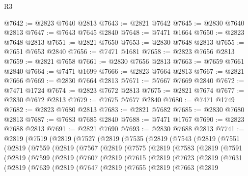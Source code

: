 \begin{lexlean}{R3}
\begin{coremodule}
@7642 := @2823 @7640 @2813
@7643 := @2821 @7642
@7645 := @2830 @7640 @2813
@7647 := @7643 @7645 @2840
@7648 := @7471 @1664
@7650 := @2823 @7648 @2813
@7651 := @2821 @7650
@7653 := @2830 @7648 @2813
@7655 := @7651 @7653 @2840
@7656 := @7471 @1681
@7658 := @2823 @7656 @2813
@7659 := @2821 @7658
@7661 := @2830 @7656 @2813
@7663 := @7659 @7661 @2840
@7664 := @7471 @1699
@7666 := @2823 @7664 @2813
@7667 := @2821 @7666
@7669 := @2830 @7664 @2813
@7671 := @7667 @7669 @2840
@7672 := @7471 @1724
@7674 := @2823 @7672 @2813
@7675 := @2821 @7674
@7677 := @2830 @7672 @2813
@7679 := @7675 @7677 @2840
@7680 := @7471 @1749
@7682 := @2823 @7680 @2813
@7683 := @2821 @7682
@7685 := @2830 @7680 @2813
@7687 := @7683 @7685 @2840
@7688 := @7471 @1767
@7690 := @2823 @7688 @2813
@7691 := @2821 @7690
@7693 := @2830 @7688 @2813
@7741 := @2819
    (@7519
      (@2819
        (@7527
          (@2819
            (@7535
              (@2819
                (@7543
                  (@2819
                    (@7551
                      (@2819
                        (@7559
                          (@2819
                            (@7567
                              (@2819
                                (@7575
                                  (@2819
                                    (@7583
                                      (@2819
                                        (@7591
                                          (@2819
                                            (@7599
                                              (@2819
                                                (@7607
                                                  (@2819
                                                    (@7615
                                                      (@2819
                                                        (@7623
                                                          (@2819
                                                            (@7631
                                                              (@2819
                                                                (@7639
                                                                  (@2819
                                                                    (@7647
                                                                      (@2819
                                                                        (@7655
                                                                          (@2819
                                                                            (@7663
                                                                              (@2819

\end{coremodule}
\end{lexlean}
